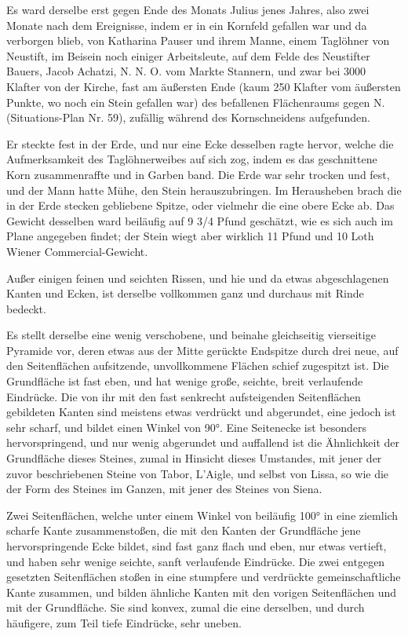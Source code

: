 \documentclass[a4paper, 11pt, oneside, german]{article}
\begin{document}
Es ward derselbe erst gegen Ende des Monats Julius jenes Jahres, also zwei Monate nach dem Ereignisse, indem er in ein Kornfeld gefallen war und da verborgen blieb, von Katharina Pauser und ihrem Manne, einem Taglöhner von Neustift, im Beisein noch einiger Arbeitsleute, auf dem Felde des Neustifter Bauers, Jacob Achatzi, N. N. O. vom Markte Stannern, und zwar bei 3000 Klafter von der Kirche, fast am äußersten Ende (kaum 250 Klafter vom äußersten Punkte, wo noch ein Stein gefallen war) des befallenen Flächenraums gegen N. (Situations-Plan Nr. 59), zufällig während des Kornschneidens aufgefunden.

Er steckte fest in der Erde, und nur eine Ecke desselben ragte hervor, welche die Aufmerksamkeit des Taglöhnerweibes auf sich zog, indem es das geschnittene Korn zusammenraffte und in Garben band. Die Erde war sehr trocken und fest, und der Mann hatte Mühe, den Stein herauszubringen. Im Herausheben brach die in der Erde stecken gebliebene Spitze, oder vielmehr die eine obere Ecke ab. Das Gewicht desselben ward beiläufig auf 9 3/4 Pfund geschätzt, wie es sich auch im Plane angegeben findet; der Stein wiegt aber wirklich 11 Pfund und 10 Loth Wiener Commercial-Gewicht.

Außer einigen feinen und seichten Rissen, und hie und da etwas abgeschlagenen Kanten und Ecken, ist derselbe vollkommen ganz und durchaus mit Rinde bedeckt.

Es stellt derselbe eine wenig verschobene, und beinahe gleichseitig vierseitige Pyramide vor, deren etwas aus der Mitte gerückte Endspitze durch drei neue, auf den Seitenflächen aufsitzende, unvollkommene Flächen schief zugespitzt ist. Die Grundfläche ist fast eben, und hat wenige große, seichte, breit verlaufende Eindrücke. Die von ihr mit den fast senkrecht aufsteigenden Seitenflächen gebildeten Kanten sind meistens etwas verdrückt und abgerundet, eine jedoch ist sehr scharf, und bildet einen Winkel von 90°. Eine Seitenecke ist besonders hervorspringend, und nur wenig abgerundet und auffallend ist die Ähnlichkeit der Grundfläche dieses Steines, zumal in Hinsicht dieses Umstandes, mit jener der zuvor beschriebenen Steine von Tabor, L'Aigle, und selbst von Lissa, so wie die der Form des Steines im Ganzen, mit jener des Steines von Siena.

Zwei Seitenflächen, welche unter einem Winkel von beiläufig 100° in eine ziemlich scharfe Kante zusammenstoßen, die mit den Kanten der Grundfläche jene hervorspringende Ecke bildet, sind fast ganz flach und eben, nur etwas vertieft, und haben sehr wenige seichte, sanft verlaufende Eindrücke. Die zwei entgegen gesetzten Seitenflächen stoßen in eine stumpfere und verdrückte gemeinschaftliche Kante zusammen, und bilden ähnliche Kanten mit den vorigen Seitenflächen und mit der Grundfläche. Sie sind konvex, zumal die eine derselben, und durch häufigere, zum Teil tiefe Eindrücke, sehr uneben.
\end{document}
